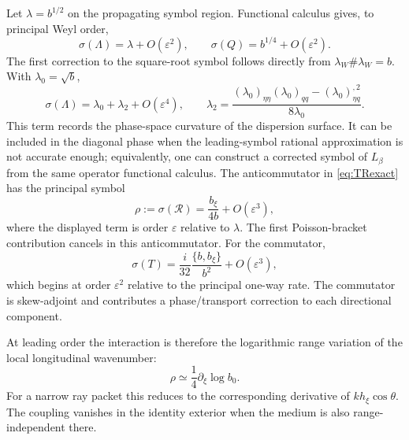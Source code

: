\documentclass[11pt]{article}
\newcommand{\pd}{\partial}
\newcommand{\Rop}{\mathcal R}
\newcommand{\eps}{\varepsilon}
\begin{document}
Let $\lambda=b^{1/2}$ on the propagating symbol region. Functional calculus
gives, to principal Weyl order,
\begin{equation}\label{eq:symbolroots}
  \sigma(\Lambda)=\lambda+O(\eps^2),\qquad
  \sigma(Q)=b^{1/4}+O(\eps^2).
\end{equation}
The first correction to the square-root symbol follows directly from
$\lambda_W\#\lambda_W=b$. With $\lambda_0=\sqrt b$,
\begin{equation}\label{eq:sqrtcorrection}
  \sigma(\Lambda)=\lambda_0+\lambda_2+O(\eps^4),\qquad
  \lambda_2=\frac{(\lambda_0)_{\eta\eta}(\lambda_0)_{qq}
  -(\lambda_0)_{\eta q}^{,2}}{8\lambda_0}.
\end{equation}
This term records the phase-space curvature of the dispersion surface. It
can be included in the diagonal phase when the leading-symbol rational
approximation is not accurate enough; equivalently, one can construct a
corrected symbol of $L_\beta$ from the same operator functional calculus.
The anticommutator in \eqref{eq:TRexact} has the principal symbol
\begin{equation}\label{eq:Rsymbol}
  \rho:=\sigma(\Rop)=\frac{b_\xi}{4b}+O(\eps^3),
\end{equation}
where the displayed term is order $\eps$ relative to $\lambda$. The first
Poisson-bracket contribution cancels in this anticommutator. For the
commutator,
\begin{equation}\label{eq:Tsymbol}
  \sigma(T)=\frac{i}{32}\frac{\{b,b_\xi\}}{b^2}+O(\eps^3),
\end{equation}
which begins at order $\eps^2$ relative to the principal one-way rate. The
commutator is skew-adjoint and contributes a phase/transport correction to
each directional component.

At leading order the interaction is therefore the logarithmic range
variation of the local longitudinal wavenumber:
\begin{equation}\label{eq:rhoangle}
  \rho\simeq\frac14\pd_\xi\log b_0.
\end{equation}
For a narrow ray packet this reduces to the corresponding derivative of
$kh_\xi\cos\theta$. The coupling vanishes in the identity exterior when the
medium is also range-independent there.
\end{document}
